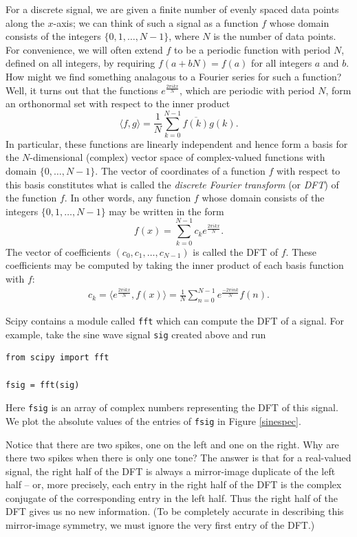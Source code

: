 For a discrete signal, we are given a finite number of evenly spaced data points along the $x$-axis; we can think of such a signal as a function $f$ whose domain consists of the integers $\{0,1,\dots,N-1\}$, where $N$ is the number of data points. 
For convenience, we will often extend $f$ to be a periodic function with period $N$, defined on all integers, by requiring $f(a+bN)=f(a)$ for all integers $a$ and $b$. 
How might we find something analagous to a Fourier series for such a function? 
Well, it turns out that the functions $e^{\frac{2\pi ikx}N}$, which are periodic with period $N$, form an orthonormal set with respect to the inner product
\[
\langle f,g\rangle = \frac1N\sum_{k=0}^{N-1}\overline{f(k)}g(k).
\]
In particular, these functions are linearly independent and hence form a basis for the $N$-dimensional (complex) vector space of complex-valued functions with domain $\{0,\dots,N-1\}$.
The vector of coordinates of a function $f$ with respect to this basis constitutes what is called the \emph{discrete Fourier transform} (or \emph{DFT}) of the function $f$.
In other words, any function $f$ whose domain consists of the integers $\{0,1,\dots,N-1\}$ may be written in the form
\[
f(x)=\sum_{k=0}^{N-1}c_ke^{\frac{2\pi ikx}N}.
\]
The vector of coefficients $(c_0,c_1,\dots,c_{N-1})$ is called the DFT of $f$. These coefficients may be computed by taking the inner product of each basis function with $f$:
\begin{align}
	c_k=\langle e^{\frac{2\pi ikx}N}, f(x)\rangle=\frac1N\sum_{n=0}^{N-1}e^{\frac{-2\pi ink}N}f(n) . \label{transform_coefficients}
\end{align}

Scipy contains a module called \texttt{fft} which can compute the DFT of a signal. %
For example, take the sine wave signal \texttt{sig} created above and run
\begin{lstlisting}
from scipy import fft

fsig = fft(sig)
\end{lstlisting}
Here \texttt{fsig} is an array of complex numbers representing the DFT of this signal. We plot the absolute values of the entries of \texttt{fsig} in Figure \ref{sinespec}.

Notice that there are two spikes, one on the left and one on the right.
Why are there two spikes when there is only one tone?
The answer is that for a real-valued signal, the right half of the DFT is always a mirror-image duplicate of the left half -- or, more precisely, each entry in the right half of the DFT is the complex conjugate of the corresponding entry in the left half.
Thus the right half of the DFT gives us no new information.
(To be completely accurate in describing this mirror-image symmetry, we must ignore the very first entry of the DFT.)
% 


